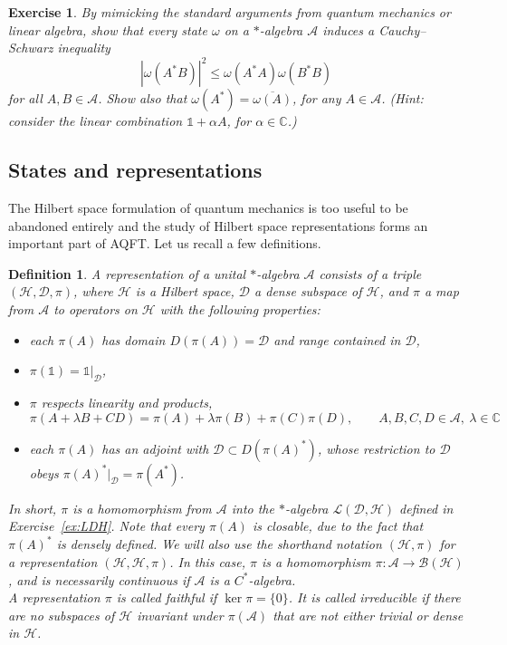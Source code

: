 \documentclass[12pt,a4paper]{article}
\newcommand{\1}{\mathds{1}}                         %
\newcommand{\CC}{\mathbb{C}}           %
\newcommand{\Hcal}{\mathcal {H}}
\newcommand{\Lcal}{\mathcal {L}}
\newcommand{\Bcal}{\mathcal {B}}
\newcommand{\HH}{{\mathcal{H}}}
\newcommand{\DD}{{\mathscr{D}}}
\newcommand{\II}{{\mathbb{1}}}
\newcommand{\Ac}{{\mathcal{A}}}
\newtheorem{exercise}[theorem]{Exercise}
\newtheorem{df}[theorem]{Definition}}
\begin{document}
\begin{exercise}
	By mimicking the standard arguments from quantum mechanics or linear algebra, show that every state $\omega$ on a $*$-algebra $\Ac$ induces a Cauchy--Schwarz inequality
	\begin{equation}\label{eq:CauchySchwarz}
	|\omega(A^*B)|^2\le \omega(A^*A)\omega(B^*B)
	\end{equation}
	for all $A,B\in\Ac$. Show also that $\omega(A^*)=\overline{\omega(A)}$, for any $A\in\Ac$. (Hint: consider the linear combination $\II+\alpha A$, for $\alpha\in\CC$.)
\end{exercise}



\subsection{States and representations}\label{sec:GNS}
The Hilbert space formulation of quantum mechanics is too useful to be abandoned entirely and the study of Hilbert space representations forms an important part of AQFT. Let us recall a few definitions. 
\begin{df}
	A \emph{representation} of a unital $*$-algebra $\Ac$ consists of
	a triple $(\HH,\DD,\pi)$, where $\HH$ is a Hilbert space, $\DD$ a dense subspace of $\HH$, and $\pi$ a map from $\Ac$ to operators on $\HH$ with the following properties: 
	\begin{itemize}
	    \item each $\pi(A)$ has domain $D(\pi(A))=\DD$ and range contained in $\DD$, 
	    \item $\pi(\II)=\II|_\DD$,
	    \item $\pi$ respects linearity and products,
	    \[
	    \pi(A+\lambda B+CD) = \pi(A) + \lambda\pi(B) + \pi(C)\pi(D), \qquad A,B,C,D\in\Ac,~\lambda\in\CC
	    \]
	    \item each $\pi(A)$ has an adjoint with $\DD\subset D(\pi(A)^*)$,  whose restriction to $\DD$ obeys $\pi(A)^*|_\DD=\pi(A^*)$.
	\end{itemize}
	In short, $\pi$ is a homomorphism  
	from $\Ac$ into the $*$-algebra $\Lcal(\DD,\HH)$ defined in  Exercise~\ref{ex:LDH}. Note that every $\pi(A)$ is closable, due to the fact that $\pi(A)^*$ is densely defined. We will also use the shorthand notation $(\HH,\pi)$ for a representation $(\HH,\HH,\pi)$. In this case, 
	$\pi$ is a homomorphism	$\pi:\Ac\rightarrow\Bcal(\Hcal)$, and is necessarily continuous if $\Ac$ is a $C^*$-algebra.
	\\
	
	\noindent A representation $\pi$ is called \emph{faithful} if $\ker \pi=\{0\}$. It is called irreducible if there are no subspaces of $\Hcal$ invariant under $\pi(\Ac)$ that are not either trivial or dense in $\Hcal$.\\
\end{df} 
\end{document}
